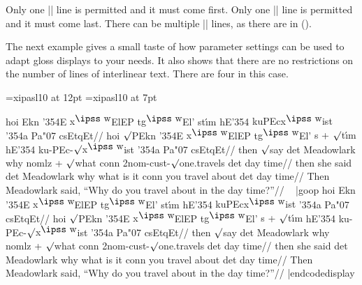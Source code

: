 Only one |\gla| line is permitted and it must come first. Only one
|\glft| line is permitted and it must come last.  There can be
multiple |\glb| lines, as there are in (\blastx).

The next example gives a small taste of how parameter settings can be
used to adapt gloss displays to your needs.  It also shows that there
are no restrictions on the number of lines of interlinear text.  There
are four in this case.


%
%
%
%

\font\ips=xipasl10 at 12pt
\font\ipss=xipasl10 at 7pt
\def\mroot{$\surd$}
\def\L{\char'354}
\def\v#1{{\accent"07 #1}}
\def\C{{\accent"07 c}}
\def\W{$^{\hbox{\ipss w}}\mskip-2mu$}


\framedisplay
\ex
\begingl
\gla[everygla=\ips] hoi Ekn {\L}E {x\W}ElEP t{g\W}El' st{\'\i}m {hE\L}
   {kuPEcx\W ist} {\L a} Pa{\v c}sEtqEt//
\glb[everyglb=\ips] hoi {\mroot}PEkn {\L}E {x\W}ElEP t{g\W}El' {s +
   \mroot t\'\i m} {hE\L} ku-PEc-\mroot{x\W}ist {\L}a Pa{\v c}sEtqEt//
\glb then {\mroot}say det Meadowlark why {nomlz + \mroot what} conn
   2nom-cust-{\mroot}one.travels det {day time}//
\glb then {she said} det Meadowlark why {what is it} conn {you travel
   about} det {day time}//
\glft Then Meadowlark said, ``Why do you travel about in the day
   time?''//
\endgl
\xe
\endframedisplay
\def\goop{\thinspace\putfnno}%
\codedisplay~
\ex|goop
\begingl
\gla[everygla=\ips] hoi Ekn {\L}E {x\W}ElEP t{g\W}El' st{\'\i}m {hE\L}
   {kuPEcx\W ist} {\L a} Pa{\v c}sEtqEt//
\glb[everyglb=\ips] hoi {\mroot}PEkn {\L}E {x\W}ElEP t{g\W}El' {s +
   \mroot t\'\i m} {hE\L} ku-PEc-\mroot{x\W}ist {\L}a Pa{\v c}sEtqEt//
\glb then {\mroot}say det Meadowlark why {nomlz + \mroot what} conn
   2nom-cust-{\mroot}one.travels det {day time}//
\glb then {she said} det Meadowlark why {what is it} conn {you travel
   about} det {day time}//
\glft Then Meadowlark said, ``Why do you travel about in the day
   time?''//
\endgl
\xe
|endcodedisplay

